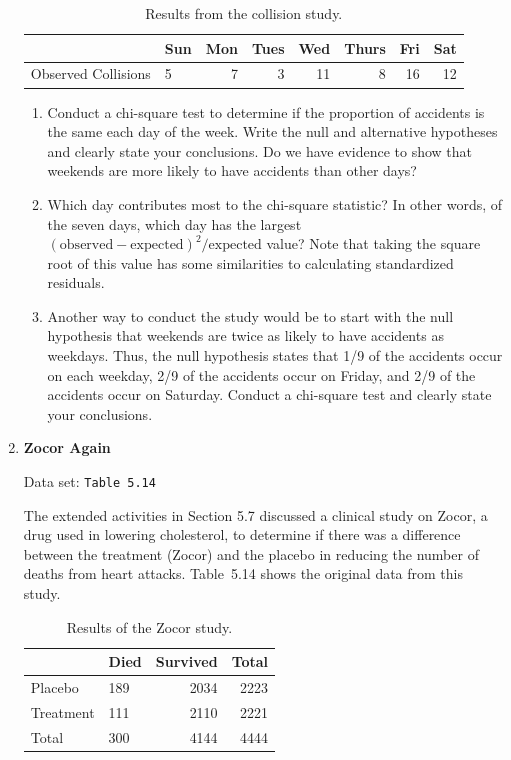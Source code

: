 \documentclass[
]{report}
\begin{document}
\begin{enumerate}
\begin{table}[!h]
\centering
\caption{\label{tab:tab13} Results from the collision study.}
\centering
\begin{tabular}[t]{llrrrrrr}
\toprule
  & Sun & Mon & Tues & Wed & Thurs & Fri & Sat\\
\midrule
Observed Collisions & 5 & 7 & 3 & 11 & 8 & 16 & 12\\
\bottomrule
\end{tabular}
\end{table}
  \begin{enumerate}
    \item Conduct a chi-square test to determine if the proportion of accidents is the same each day of the week. Write the null and alternative hypotheses and clearly state your conclusions. Do we have evidence to show that weekends are more likely to have accidents than other days?
    \item Which day contributes most to the chi-square statistic? In other words, of the seven days, which day has the largest \((\text{observed} - \text{expected})^2/\text{expected}\) value? Note that taking the square root of
this value has some similarities to calculating standardized residuals.
    \item Another way to conduct the study would be to start with the null hypothesis that weekends are twice as likely to have accidents as weekdays. Thus, the null hypothesis states that 1/9 of the accidents occur on each weekday, 2/9 of the accidents occur on Friday, and 2/9 of the accidents occur on Saturday. Conduct a chi-square test and clearly state your conclusions.
  \end{enumerate}

  \item \textbf{Zocor Again}    

  Data set: \texttt{Table 5.14}   
  
  The extended activities in Section 5.7 discussed a clinical study on Zocor, a drug used in lowering cholesterol, to determine if there was a difference between the treatment (Zocor) and the placebo in reducing the number of deaths from heart attacks. Table 5.14 shows the original data from this study.  
  
\begin{table}[!h]
\centering
\caption{\label{tab:tab14} Results of the Zocor study.}
\centering
\begin{tabular}[t]{llrr}
\toprule
  & Died & Survived & Total\\
\midrule
Placebo & 189 & 2034 & 2223\\
Treatment & 111 & 2110 & 2221\\
Total & 300 & 4144 & 4444\\
\bottomrule
\end{tabular}
\end{table}
  

\end{enumerate}
\end{document}
